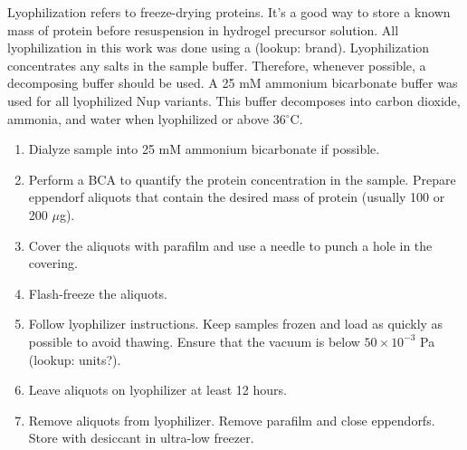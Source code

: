 Lyophilization refers to freeze-drying proteins.  It's a good way to store a known mass of protein before resuspension in hydrogel precursor solution.  All lyophilization in this work was done using a (lookup: brand).  Lyophilization concentrates any salts in the sample buffer.  Therefore, whenever possible, a decomposing buffer should be used.  A 25 mM ammonium bicarbonate buffer was used for all lyophilized Nup variants.  This buffer decomposes into carbon dioxide, ammonia, and water when lyophilized or above 36$^\circ$C.

\begin{enumerate}
\item Dialyze sample into 25 mM ammonium bicarbonate if possible.
\item Perform a BCA to quantify the protein concentration in the sample.  Prepare eppendorf aliquots that contain the desired mass of protein (usually 100 or 200 $\mu$g).
\item Cover the aliquots with parafilm and use a needle to punch a hole in the covering.
\item Flash-freeze the aliquots.
\item Follow lyophilizer instructions.  Keep samples frozen and load as quickly as possible to avoid thawing.  Ensure that the vacuum is below $50 \times 10^{-3}$ Pa (lookup: units?).
\item Leave aliquots on lyophilizer at least 12 hours.
\item Remove aliquots from lyophilizer. Remove parafilm and close eppendorfs. Store with desiccant in ultra-low freezer.
\end{enumerate}


